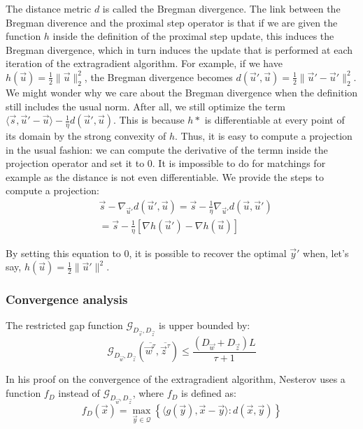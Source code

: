 The distance metric $d$ is called the Bregman divergence. The link between the
Bregman diverence and the proximal step operator is that if we are given the
function $h$ inside the definition of the proximal step update, this induces the
Bregman divergence, which in turn induces the update that is performed at each
iteration of the extragradient algorithm. For example, if we have $h(\vec u) =
\frac{1}{2} \lVert \vec u \rVert_2^2 $, the Bregman divergence becomes $d(\vec
u', \vec u) = \frac{1}{2} \lVert \vec u' - \vec u' \rVert_2^2$. We might wonder
why we care about the Bregman divergence when the definition still includes the
usual norm. After all, we still optimize the term $\langle \vec s, \vec u' -
\vec u \rangle - \frac{1}{\eta} d(\vec u', \vec u)$. This is because $h*$ is
differentiable at every point of its domain by the strong convexity of $h$.
Thus, it is easy to compute a projection in the usual fashion: we can compute
the derivative of the termn inside the projection operator and set it to 0. It
is impossible to do for matchings for example as the distance is not even
differentiable. We provide the steps to compute a projection:
\begin{equation}
\begin{aligned}
  &\vec s - \nabla_{\vec u'} d(\vec u', \vec u) = \vec s - \frac{1}{\eta} \nabla_{\vec u'} d(\vec u, \vec u')\\
  &= \vec s - \frac{1}{\eta} \left [\nabla h(\vec u') - \nabla h(\vec u) \right]
\end{aligned}
\end{equation}

By setting this equation to 0, it is possible to recover the optimal $\vec y'$
when, let's say, $h(\vec u) = \frac{1}{2} \lVert \vec u' \rVert^2$.

\subsubsection{Convergence analysis}

The restricted gap function $\mathcal{G}_{D_{\vec v}, D_{\vec z}}$ is upper
bounded by:
\begin{equation}
  \mathcal{G}_{D_{\vec w}, D_{\vec z}}(\overline{\vec w^{\tau}}, \overline{\vec
z^{\tau}}) \leq \frac{\left( D_{\vec w} + D_{\vec z} \right) L}{\tau + 1}
\label{eq:ub}
\end{equation}

In his proof on the convergence of the extragradient algorithm, Nesterov uses a
function $f_D$ instead of $\mathcal{G}_{D_{\vec w}, D_{\vec z}}$, where $f_D$ is
defined as:
\begin{equation}
f_D(\vec x) = \max_{\vec y \in \mathcal{Q}} \left \{ \langle g(\vec y), \vec x -
\vec y \rangle : d(\vec x, \vec y) \right \}
\end{equation}

